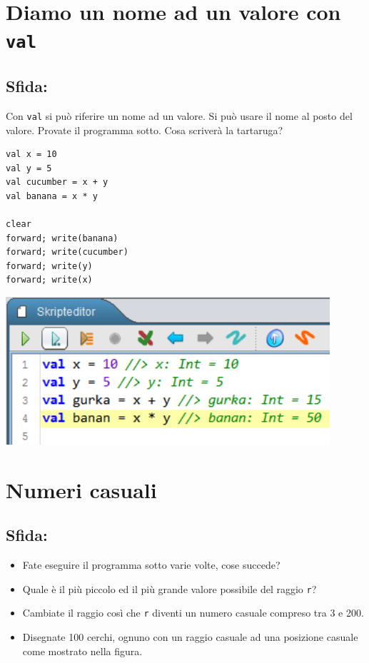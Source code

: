 \chapter{Diamo un nome ad un valore con \lstinline{val}}
\begin{multicols}{2}
\section*{\color{BrickRed}Sfida:}
Con \lstinline{val} si può riferire un nome ad un valore. Si può usare il nome al posto del valore. Provate il programma sotto. Cosa scriverà la tartaruga?

\begin{lstlisting}[numbers=none]
val x = 10
val y = 5
val cucumber = x + y
val banana = x * y

clear
forward; write(banana)
forward; write(cucumber)
forward; write(y)
forward; write(x)
\end{lstlisting}
        

\columnbreak

\begin{center}
\includegraphics[width=12.0cm]{../img/val.png}
\end{center}

\end{multicols}

\chapter{Numeri casuali}\section*{\color{BrickRed}Sfida:}


\begin{itemize}

\item {Fate eseguire il programma sotto varie volte, cose succede?}
\item {Quale è il più piccolo ed il più grande valore possibile del raggio \lstinline{r}?}
\item {Cambiate il raggio così che \lstinline{r} diventi un numero casuale compreso tra 3 e 200.}
\item {Disegnate 100 cerchi, ognuno con un raggio casuale ad una posizione casuale come mostrato nella figura.}

\end{itemize}



